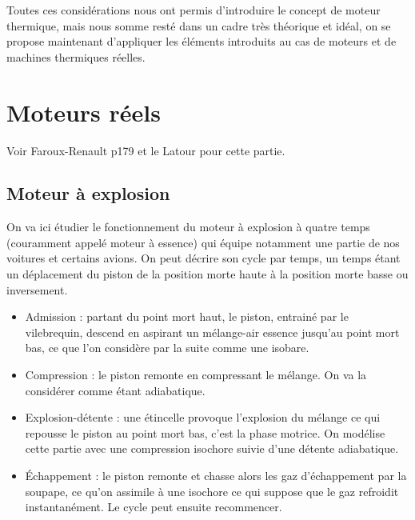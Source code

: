 \documentclass[12pt,prb,aps,epsf]{report}
\begin{document}
Toutes ces considérations nous ont permis d'introduire le concept de moteur thermique, mais nous somme resté dans un cadre très théorique et idéal, on se propose maintenant d'appliquer les éléments introduits au cas de moteurs et de machines thermiques réelles. 

\section{Moteurs réels}
Voir Faroux-Renault p179 et le Latour pour cette partie.

\subsection{Moteur à explosion}

On va ici étudier le fonctionnement du moteur à explosion à quatre temps (couramment appelé moteur à essence) qui équipe notamment une partie de nos voitures et certains avions. On peut décrire son cycle par temps, un temps étant un déplacement du piston de la position morte haute à la position morte basse ou inversement.
\begin{itemize}
	\item Admission : partant du point mort haut, le piston, entrainé par le vilebrequin, descend en aspirant un mélange-air essence jusqu'au point mort bas, ce que l'on considère par la suite comme une isobare.
	\item Compression : le piston remonte en compressant le mélange. On va la considérer comme étant adiabatique.
	\item Explosion-détente : une étincelle provoque l'explosion du mélange ce qui repousse le piston au point mort bas, c'est la phase motrice. On modélise cette partie avec une compression isochore suivie d'une détente adiabatique.
	\item Échappement : le piston remonte et chasse alors les gaz d'échappement par la soupape, ce qu'on assimile à une isochore ce qui suppose que le gaz refroidit instantanément. Le cycle peut ensuite recommencer.
\end{itemize}
\end{document}
